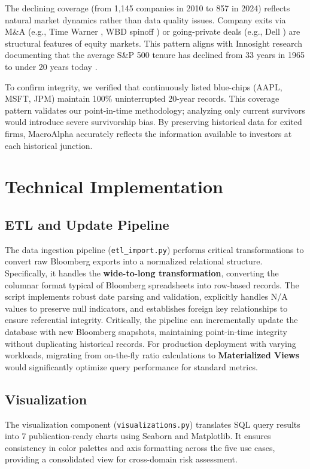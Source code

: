 \documentclass[10pt,a4paper]{article}
\begin{document}
The declining coverage (from 1,145 companies in 2010 to 857 in 2024) reflects natural market dynamics rather than data quality issues. Company exits via M\&A (e.g., Time Warner \cite{att_timewarner2018}, WBD spinoff \cite{wbd_spinoff2022}) or going-private deals (e.g., Dell \cite{dell_private2013,dell_ipo2018}) are structural features of equity markets. This pattern aligns with Innosight research documenting that the average S\&P 500 tenure has declined from 33 years in 1965 to under 20 years today \cite{innosight_longevity}. 

To confirm integrity, we verified that continuously listed blue-chips (AAPL, MSFT, JPM) maintain 100\% uninterrupted 20-year records. This coverage pattern validates our point-in-time methodology; analyzing only current survivors would introduce severe survivorship bias. By preserving historical data for exited firms, MacroAlpha accurately reflects the information available to investors at each historical junction.

\section{Technical Implementation}

\subsection{ETL and Update Pipeline}
The data ingestion pipeline (\texttt{etl\_import.py}) performs critical transformations to convert raw Bloomberg exports into a normalized relational structure. Specifically, it handles the \textbf{wide-to-long transformation}, converting the columnar format typical of Bloomberg spreadsheets into row-based records. The script implements robust date parsing and validation, explicitly handles N/A values to preserve null indicators, and establishes foreign key relationships to ensure referential integrity. Critically, the pipeline can incrementally update the database with new Bloomberg snapshots, maintaining point-in-time integrity without duplicating historical records. For production deployment with varying workloads, migrating from on-the-fly ratio calculations to \textbf{Materialized Views} would significantly optimize query performance for standard metrics.

\subsection{Visualization}
The visualization component (\texttt{visualizations.py}) translates SQL query results into 7 publication-ready charts using Seaborn and Matplotlib. It ensures consistency in color palettes and axis formatting across the five use cases, providing a consolidated view for cross-domain risk assessment.
\end{document}
